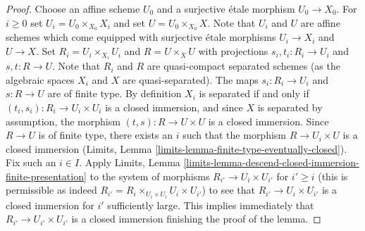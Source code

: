 \documentclass{stacks-project}
\theoremstyle{plain}
\theoremstyle{definition}
\theoremstyle{remark}
\numberwithin{equation}{subsection}
\begin{document}
\begin{proof}
Choose an affine scheme $U_0$ and a surjective \'etale morphism $U_0 \to X_0$.
For $i \geq 0$ set $U_i = U_0 \times_{X_0} X_i$ and set
$U = U_0 \times_{X_0} X$. Note that $U_i$ and $U$ are affine schemes
which come equipped with surjective \'etale morphisms $U_i \to X_i$
and $U \to X$. Set $R_i = U_i \times_{X_i} U_i$ and $R = U \times_X U$
with projections $s_i, t_i : R_i \to U_i$ and $s, t : R \to U$.
Note that $R_i$ and $R$ are quasi-compact separated schemes (as the
algebraic spaces $X_i$ and $X$ are quasi-separated). The maps
$s_i : R_i \to U_i$ and $s : R \to U$ are of finite type.
By definition $X_i$ is separated if and only if
$(t_i, s_i) : R_i \to U_i \times U_i$
is a closed immersion, and since $X$ is separated by assumption,
the morphism $(t, s) : R \to U \times U$ is a closed immersion. Since
$R \to U$ is of finite type, there exists an
$i$ such that the morphism $R \to U_i \times U$ is a closed immersion
(Limits, Lemma \ref{limits-lemma-finite-type-eventually-closed}).
Fix such an $i \in I$. Apply Limits, Lemma
\ref{limits-lemma-descend-closed-immersion-finite-presentation}
to the system of morphisms $R_{i'} \to U_i \times U_{i'}$ for $i' \geq i$
(this is permissible as indeed
$R_{i'} = R_i \times_{U_i \times U_i} U_i \times U_{i'}$)
to see that $R_{i'} \to U_i \times U_{i'}$ is a closed immersion
for $i'$ sufficiently large. This implies immediately
that $R_{i'} \to U_{i'} \times U_{i'}$ is a closed immersion
finishing the proof of the lemma.
\end{proof}
\end{document}
